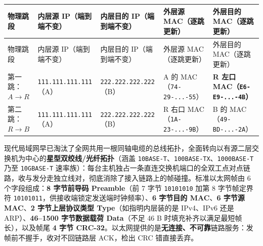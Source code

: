 \begingroup\small\setlength{\tabcolsep}{3pt}\renewcommand{\arraystretch}{1.22}
\begin{longtable}{@{}>{\raggedright\arraybackslash}p{}>{\raggedright\arraybackslash}p{}>{\raggedright\arraybackslash}p{}>{\raggedright\arraybackslash}p{}>{\raggedright\arraybackslash}p{}@{}}
\toprule
物理跳段 & 内层源 IP（端到端不变） & 内层目的 IP（端到端不变） & 外层源 MAC（逐跳更新） & 外层目的 MAC（逐跳更新） \\
\midrule\endfirsthead
物理跳段 & 内层源 IP（端到端不变） & 内层目的 IP（端到端不变） & 外层源 MAC（逐跳更新） & 外层目的 MAC（逐跳更新） \\
\midrule\endhead
\bottomrule\endfoot
第一跳：$A \to R$ & \texttt{111.111.111.111}（A） & \texttt{222.222.222.222}（B） & A 的 MAC（\texttt{74-29-...-55}） & \textbf{R 左口 MAC（\texttt{E6-E9-...-4B}）} \\
第二跳：$R \to B$ & \texttt{111.111.111.111}（A） & \texttt{222.222.222.222}（B） & R 右口 MAC（\texttt{1A-23-...-9B}） & B 的 MAC（\texttt{49-BD-...-2A}） \\
\end{longtable}\endgroup



现代局域网早已淘汰了全网共用一根同轴电缆的总线拓扑，全面转向以有源二层交换机为中心的\textbf{星型双绞线/光纤拓扑}（涵盖 \texttt{10BASE-T}、\texttt{100BASE-TX}、\texttt{1000BASE-T} 乃至 \texttt{10GBASE-T} 速率族）：每台主机独占一条直连交换机端口的全双工点对点链路，收与发分走独立线对，彻底消除了接入链路上的帧碰撞。标准以太网帧由 6 个字段组成：\textbf{8 字节前导码 Preamble}（前 7 字节 \texttt{10101010} 加第 8 字节帧定界符 \texttt{10101011}，供接收端锁定发送端时钟频率）、\textbf{6 字节目的 MAC}、\textbf{6 字节源 MAC}、\textbf{2 字节上层协议类型 Type}（如指明内层装的是 IPv4、IPv6 还是 ARP）、\textbf{46–1500 字节数据载荷 Data}（不足 46 B 时填充补齐以满足最短帧长），以及帧尾 \textbf{4 字节 CRC-32}。以太网提供的是\textbf{无连接、不可靠}链路服务：发帧前不握手，收对不回链路层 ACK，检出 CRC 错直接丢弃。

